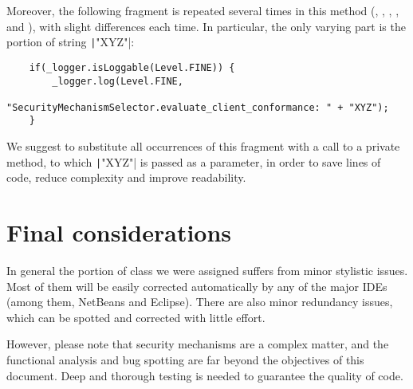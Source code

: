 Moreover, the following fragment is repeated several times in this method  (, , , , and ), with slight differences each time. In particular, the only varying part is the portion of string \texttt|"XYZ"|:

\begin{verbatim}
	if(_logger.isLoggable(Level.FINE)) {
		_logger.log(Level.FINE,
				"SecurityMechanismSelector.evaluate_client_conformance: " + "XYZ");
	}
\end{verbatim}
	
We suggest to substitute all occurrences of this fragment with a call to a private method, to which \texttt|"XYZ"| is passed as a parameter, in order to save lines of code, reduce complexity and improve readability.



\section{Final considerations}
In general the portion of class we were assigned suffers from minor stylistic issues. Most of them will be easily corrected automatically by any of the major IDEs (among them, NetBeans and Eclipse). There are also minor redundancy issues, which can be spotted and corrected with little effort.

However, please note that security mechanisms are a complex matter, and the functional analysis and bug spotting are far beyond the objectives of this document. Deep and thorough testing is needed to guarantee the quality of code.




